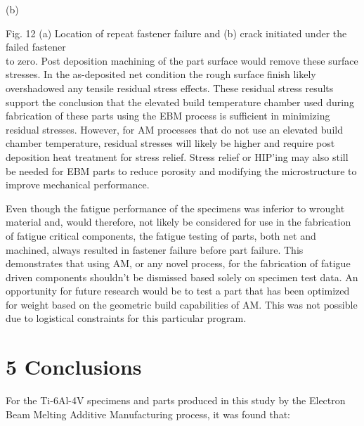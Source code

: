 \documentclass[10pt]{article}
\begin{document}
(b)

Fig. 12 (a) Location of repeat fastener failure and (b) crack initiated under the failed fastener\\
to zero. Post deposition machining of the part surface would remove these surface stresses. In the as-deposited net condition the rough surface finish likely overshadowed any tensile residual stress effects. These residual stress results support the conclusion that the elevated build temperature chamber used during fabrication of these parts using the EBM process is sufficient in minimizing residual stresses. However, for AM processes that do not use an elevated build chamber temperature, residual stresses will likely be higher and require post deposition heat treatment for stress relief. Stress relief or HIP'ing may also still be needed for EBM parts to reduce porosity and modifying the microstructure to improve mechanical performance.

Even though the fatigue performance of the specimens was inferior to wrought material and, would therefore, not likely be considered for use in the fabrication of fatigue critical components, the fatigue testing of parts, both net and machined, always resulted in fastener failure before part failure. This demonstrates that using AM, or any novel process, for the fabrication of fatigue driven components shouldn't be dismissed based solely on specimen test data. An opportunity for future research would be to test a part that has been optimized for weight based on the geometric build capabilities of AM. This was not possible due to logistical constraints for this particular program.

\section*{5 Conclusions}
For the Ti-6Al-4V specimens and parts produced in this study by the Electron Beam Melting Additive Manufacturing process, it was found that:
\end{document}
